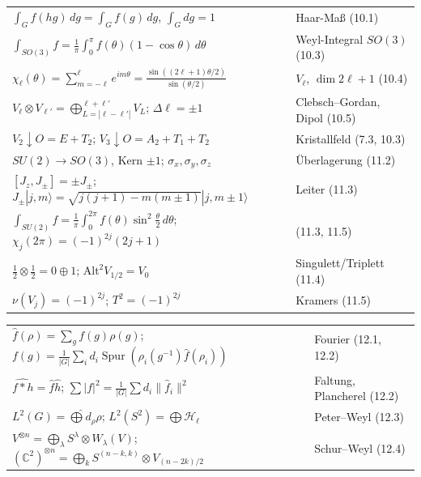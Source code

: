 \begin{merksatz}
\begin{center}
{\small
\renewcommand{\arraystretch}{1.35}
\begin{tabular}{@{}P{4.8cm}P{3.8cm}@{}}
\toprule
$\int_Gf(hg)\,dg = \int_Gf(g)\,dg$, $\int_G dg = 1$ & Haar-Maß (10.1)\\
$\int_{SO(3)}f = \frac1\pi\int_0^{\pi}f(\theta)(1 - \cos\theta)\,d\theta$ & Weyl-Integral $SO(3)$ (10.3)\\
$\chi_\ell(\theta) = \sum_{m=-\ell}^{\ell}e^{im\theta} = \frac{\sin((2\ell + 1)\theta/2)}{\sin(\theta/2)}$ & $V_\ell$, $\dim 2\ell + 1$ (10.4)\\
$V_\ell\otimes V_{\ell'} = \bigoplus_{L = |\ell - \ell'|}^{\ell + \ell'}V_L$; $\Delta\ell = \pm1$ & Clebsch--Gordan, Dipol (10.5)\\
$V_2\downarrow O = E + T_2$; $V_3\downarrow O = A_2 + T_1 + T_2$ & Kristallfeld (7.3, 10.3)\\
$SU(2)\to SO(3)$, Kern $\pm1$; $\sigma_x, \sigma_y, \sigma_z$ & Überlagerung (11.2)\\
$[J_z, J_\pm] = \pm J_\pm$; $J_\pm|j, m\rangle = \sqrt{j(j + 1) - m(m\pm1)}|j, m\pm1\rangle$ & Leiter (11.3)\\
$\int_{SU(2)}f = \frac1\pi\int_0^{2\pi}f(\theta)\sin^{2}\frac\theta2\,d\theta$; $\chi_j(2\pi) = (-1)^{2j}(2j + 1)$ & (11.3, 11.5)\\
$\tfrac12\otimes\tfrac12 = 0\oplus1$; $\mathrm{Alt}^{2}V_{1/2} = V_0$ & Singulett/Triplett (11.4)\\
$\nu(V_j) = (-1)^{2j}$; $T^{2} = (-1)^{2j}$ & Kramers (11.5)\\
\bottomrule
\end{tabular}}
\end{center}
\begin{center}
{\small
\renewcommand{\arraystretch}{1.35}
\begin{tabular}{@{}P{4.8cm}P{3.8cm}@{}}
\toprule
$\hat f(\rho) = \sum_gf(g)\rho(g)$; $f(g) = \frac1{|G|}\sum_id_i\operatorname{Spur}(\rho_i(g^{-1})\hat f(\rho_i))$ & Fourier (12.1, 12.2)\\
$\widehat{f * h} = \hat f\hat h$; $\sum|f|^{2} = \frac1{|G|}\sum d_i\|\hat f_i\|^{2}$ & Faltung, Plancherel (12.2)\\
$L^{2}(G) = \widehat\bigoplus d_\rho\rho$; $L^{2}(S^{2}) = \bigoplus\mathcal H_\ell$ & Peter--Weyl (12.3)\\
$V^{\otimes n} = \bigoplus_\lambda S^{\lambda}\otimes W_\lambda(V)$; $(\mathbb C^{2})^{\otimes n} = \bigoplus_kS^{(n-k,k)}\otimes V_{(n-2k)/2}$ & Schur--Weyl (12.4)\\

\end{tabular}}
\end{center}
\end{merksatz}

